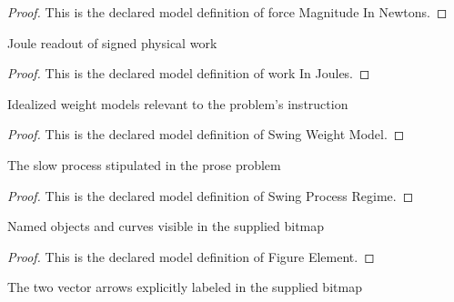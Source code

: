 \begin{proof}
  This is the declared model definition of force Magnitude In Newtons.
\end{proof}
\begin{definition}
  \label{def:physics:phyx-mini-0809:phyxminiproblems-problemphyxmini0809-workinjoules}
  Joule readout of signed physical work
\end{definition}
\begin{proof}
  This is the declared model definition of work In Joules.
\end{proof}
\begin{definition}
  \label{def:physics:phyx-mini-0809:phyxminiproblems-problemphyxmini0809-swingweightmodel}
  Idealized weight models relevant to the problem's instruction
\end{definition}
\begin{proof}
  This is the declared model definition of Swing Weight Model.
\end{proof}
\begin{definition}
  \label{def:physics:phyx-mini-0809:phyxminiproblems-problemphyxmini0809-swingprocessregime}
  The slow process stipulated in the prose problem
\end{definition}
\begin{proof}
  This is the declared model definition of Swing Process Regime.
\end{proof}
\begin{definition}
  \label{def:physics:phyx-mini-0809:phyxminiproblems-problemphyxmini0809-figureelement}
  Named objects and curves visible in the supplied bitmap
\end{definition}
\begin{proof}
  This is the declared model definition of Figure Element.
\end{proof}
\begin{definition}
  \label{def:physics:phyx-mini-0809:phyxminiproblems-problemphyxmini0809-figurevectorlabel}
  The two vector arrows explicitly labeled in the supplied bitmap
\end{definition}
